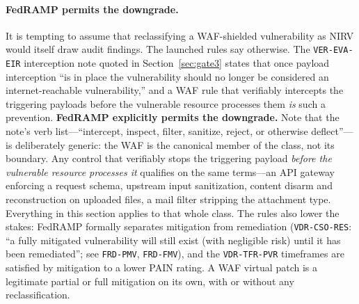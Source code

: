 \documentclass[11pt]{article}
\newcommand{\code}[1]{\texttt{#1}}
\begin{document}
\paragraph{FedRAMP permits the downgrade.} It is tempting to assume that reclassifying a WAF-shielded vulnerability as NIRV would itself draw audit findings. The launched rules say otherwise. The \code{VER-EVA-EIR} interception note quoted in Section~\ref{sec:gate3} states that once payload interception ``is in place the vulnerability should no longer be considered an internet-reachable vulnerability,'' and a WAF rule that verifiably intercepts the triggering payloads before the vulnerable resource processes them \emph{is} such a prevention. \textbf{FedRAMP explicitly permits the downgrade.} Note that the note's verb list---``intercept, inspect, filter, sanitize, reject, or otherwise deflect''---is deliberately generic: the WAF is the canonical member of the class, not its boundary. Any control that verifiably stops the triggering payload \emph{before the vulnerable resource processes it} qualifies on the same terms---an API gateway enforcing a request schema, upstream input sanitization, content disarm and reconstruction on uploaded files, a mail filter stripping the attachment type. Everything in this section applies to that whole class. The rules also lower the stakes: FedRAMP formally separates mitigation from remediation (\code{VDR-CSO-RES}: ``a fully mitigated vulnerability will still exist (with negligible risk) until it has been remediated''; see \code{FRD-PMV}, \code{FRD-FMV}), and the \code{VDR-TFR-PVR} timeframes are satisfied by mitigation to a lower PAIN rating. A WAF virtual patch is a legitimate partial or full mitigation on its own, with or without any reclassification.
\end{document}
